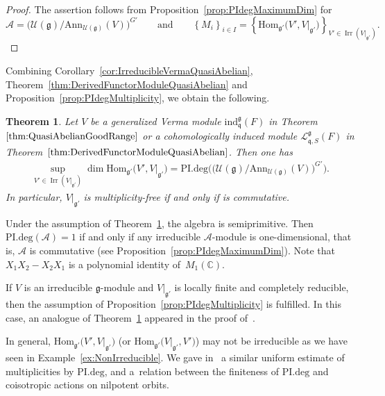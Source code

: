 \documentclass[pdftex]{sigma}
\numberwithin{equation}{section}
\newtheorem{Theorem}{Theorem}[section]
\theoremstyle{definition}
\newcommand{\set}[1]{\left\{#1 \right\}}
\newcommand{\Hom}{\mathrm{Hom}}
\newcommand{\BasicRing}[1]{\mathbb{#1}}
\newcommand{\CC}{\BasicRing{C}}
\newcommand{\Ann}{\mathrm{Ann}}
\newcommand{\PIdeg}{\mathrm{PI.deg}}
\newcommand{\alg}[1]{\mathcal{#1}}
\newcommand{\lieC}[1]{\mathfrak{#1}}
\newcommand{\lie}[1]{\mathfrak{#1}}
\newcommand{\univ}[1]{\mathcal{U}(\lieC{#1})}
\newcommand{\ind}[2]{\mathrm{ind}^{\lieC{#1}}_{\lieC{#2}}}
\DeclareMathOperator{\Irr}{\mathrm{Irr}}
\newcommand{\lmod}[3]{\mathcal{L}^{\lie{#1}}_{\lie{#2}, #3}}
\begin{document}
\begin{proof}
	The assertion follows from Proposition~\ref{prop:PIdegMaximumDim} for
\[
\alg{A} = \bigl(\univ{g}/\Ann_{\univ{g}}(V)\bigr)^{G'}
	\qquad\text{and}\qquad
\set{M_i}_{i \in I} = \set{\Hom_{\lie{g'}}\bigl(V', V|_{\lie{g'}}\bigr)}_{V' \in \Irr(V|_{\lie{g'}})}.
\tag*{\qed}
\]
\renewcommand{\qed}{}
\end{proof}

Combining Corollary~\ref{cor:IrreducibleVermaQuasiAbelian}, Theorem~\ref{thm:DerivedFunctorModuleQuasiAbelian} and Proposition~\ref{prop:PIdegMultiplicity}, we obtain the following.

\begin{Theorem}\label{thm:PIdegMultiplicity}
	Let $V$ be a generalized Verma module $\ind{g}{q}(F)$ in Theorem~$\ref{thm:QuasiAbelianGoodRange}$ or a cohomologically induced module $\lmod{g}{q}{S}(F)$ in Theorem~$\ref{thm:DerivedFunctorModuleQuasiAbelian}$.
	Then one has
	\begin{align*}
		\sup_{V' \in \Irr(V|_{\lie{g'}})} \dim \Hom_{\lie{g'}}\bigl(V', V|_{\lie{g'}}\bigr) = \PIdeg\bigl(\bigl(\univ{g}/\Ann_{\univ{g}}(V)\bigr)^{G'}\bigr).
	\end{align*}
	In particular, $V|_{\lie{g'}}$ is multiplicity-free if and only if \smash{$\bigl(\univ{g}/\Ann_{\univ{g}}(V)\bigr)^{G'}$} is commutative.
\end{Theorem}

Under the assumption of Theorem~\ref{thm:PIdegMultiplicity}, the algebra \smash{$\alg{A}\coloneq \bigl(\univ{g}/\Ann_{\univ{g}}(V)\bigr)^{G'}$} is semiprimitive.
Then $\PIdeg(\alg{A}) = 1$ if and only if any irreducible $\alg{A}$-module is one-dimensional, that is, $\alg{A}$ is commutative (see Proposition~\ref{prop:PIdegMaximumDim}).
Note that $X_1X_2 - X_2X_1$ is a polynomial identity of~$M_1(\CC)$.

If $V$ is an irreducible $\lie{g}$-module and $V|_{\lie{g'}}$ is locally finite and completely reducible,
then the assumption of Proposition~\ref{prop:PIdegMultiplicity} is fulfilled.
In this case, an analogue of Theorem~\ref{thm:PIdegMultiplicity} appeared in the proof of~\cite[Theorem~4.3]{PeSe12}.

In general, $\Hom_{\lie{g'}}\bigl(V', V|_{\lie{g'}}\bigr)$ \big(or $\Hom_{\lie{g'}}\bigl(V|_{\lie{g'}}, V'\bigr)$\big) may not be irreducible as we have seen in Example~\ref{ex:NonIrreducible}.
We gave in~\cite{Ki20} a similar uniform estimate of multiplicities by $\PIdeg$,
and a~relation between the finiteness of $\PIdeg$ and coisotropic actions on nilpotent orbits.
\end{document}
